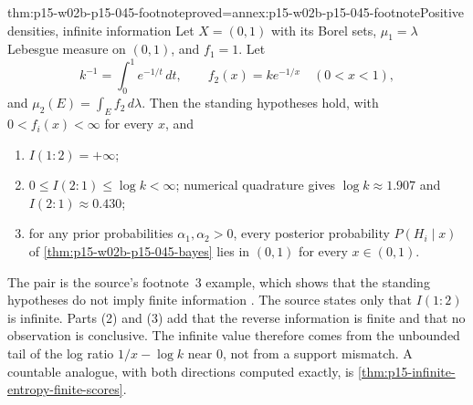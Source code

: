 \begin{hbtheorem}{thm:p15-w02b-p15-045-footnote}{proved=annex:p15-w02b-p15-045-footnote}{Positive densities, infinite information}
Let \(X=(0,1)\) with its Borel sets, \(\mu_1=\lambda\) Lebesgue measure on
\((0,1)\), and \(f_1=1\). Let
\[
  k^{-1}=\int_0^1e^{-1/t}\,dt,\qquad f_2(x)=ke^{-1/x}\quad(0<x<1),
\]
and \(\mu_2(E)=\int_Ef_2\,d\lambda\). Then the standing hypotheses hold,
with \(0<f_i(x)<\infty\) for every \(x\), and
\begin{enumerate}
\item \(I(1:2)=+\infty\);
\item \(0\leq I(2:1)\leq\log k<\infty\); numerical quadrature gives
\(\log k\approx1.907\) and \(I(2:1)\approx0.430\);
\item for any prior probabilities \(\alpha_1,\alpha_2>0\), every
posterior probability \(P(H_i\mid x)\) of
\cref{thm:p15-w02b-p15-045-bayes} lies in \((0,1)\) for every
\(x\in(0,1)\).
\end{enumerate}
\end{hbtheorem}

The pair is the source's footnote~3 example, which shows that the
standing hypotheses do not imply finite information
\cite[p.~80, n.~3]{KullbackLeibler1951Information}. The source states
only that \(I(1:2)\) is infinite. Parts (2) and (3) add that the reverse
information is finite and that no observation is conclusive. The
infinite value therefore comes from the unbounded tail of the log ratio
\(1/x-\log k\) near \(0\), not from a support mismatch. A countable
analogue, with both directions computed exactly, is
\cref{thm:p15-infinite-entropy-finite-scores}.

